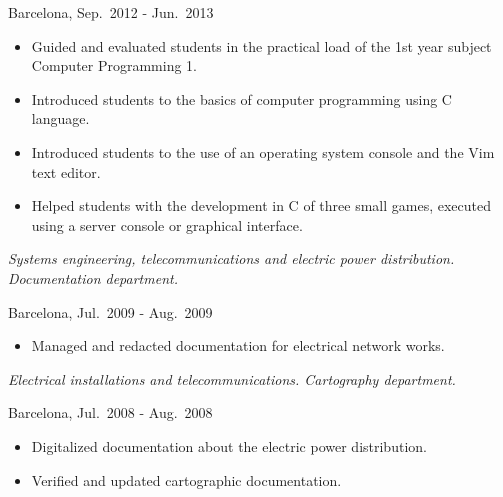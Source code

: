 \begin{description}[itemsep=15pt]
        Barcelona, Sep.\ 2012 - Jun.\ 2013
        \begin{itemize}
            \item Guided and evaluated students in the practical load of the 1st year subject Computer Programming 1.
            \item Introduced students to the basics of computer programming using C language.
            \item Introduced students to the use of an operating system console and the Vim text editor.
            \item Helped students with the development in C of three small games, executed using a server console or graphical interface.
        \end{itemize}

    \item[ITC-2, Technical Assistant] \hfill

        \emph{Systems engineering, telecommunications and electric power distribution. Documentation department.}

        Barcelona, Jul.\ 2009 - Aug.\ 2009
        \begin{itemize}
            \item Managed and redacted documentation for electrical network works.
        \end{itemize}

    \item[Spark Ibérica, Technical Assistant] \hfill

        \emph{Electrical installations and telecommunications. Cartography department.}

        Barcelona, Jul.\ 2008 - Aug.\ 2008
        \begin{itemize}
            \item Digitalized documentation about the electric power distribution.
            \item Verified and updated cartographic documentation.
        \end{itemize}

\end{description}